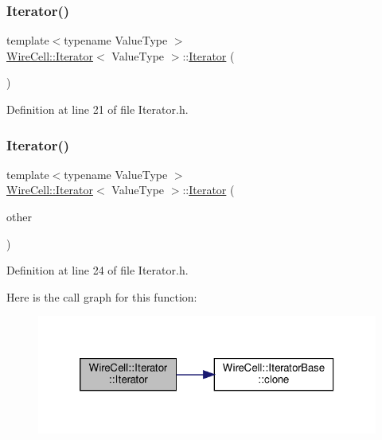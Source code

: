 \subsubsection{\texorpdfstring{Iterator()}{Iterator()}\hspace{0.1cm}{\footnotesize\ttfamily [1/3]}}
{\footnotesize\ttfamily template$<$typename Value\+Type $>$ \\
\hyperlink{class_wire_cell_1_1_iterator}{Wire\+Cell\+::\+Iterator}$<$ Value\+Type $>$\+::\hyperlink{class_wire_cell_1_1_iterator}{Iterator} (\begin{DoxyParamCaption}{ }\end{DoxyParamCaption})\hspace{0.3cm}{\ttfamily [inline]}}



Definition at line 21 of file Iterator.\+h.

\mbox{\label{class_wire_cell_1_1_iterator_a0acb021adf538918c1da13ed44ba0db1}} 
\subsubsection{\texorpdfstring{Iterator()}{Iterator()}\hspace{0.1cm}{\footnotesize\ttfamily [2/3]}}
{\footnotesize\ttfamily template$<$typename Value\+Type $>$ \\
\hyperlink{class_wire_cell_1_1_iterator}{Wire\+Cell\+::\+Iterator}$<$ Value\+Type $>$\+::\hyperlink{class_wire_cell_1_1_iterator}{Iterator} (\begin{DoxyParamCaption}\item[{const \hyperlink{class_wire_cell_1_1_iterator}{Iterator}$<$ Value\+Type $>$ \&}]{other }\end{DoxyParamCaption})\hspace{0.3cm}{\ttfamily [inline]}}



Definition at line 24 of file Iterator.\+h.

Here is the call graph for this function\+:
\nopagebreak
\begin{figure}[H]
\begin{center}
\leavevmode
\includegraphics[width=320pt]{class_wire_cell_1_1_iterator_a0acb021adf538918c1da13ed44ba0db1_cgraph}
\end{center}
\end{figure}
\mbox{\label{class_wire_cell_1_1_iterator_a1580729c388237b04a7f94ba538fcb70}} 
